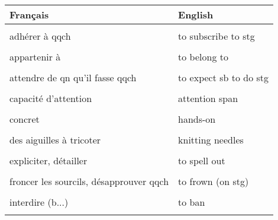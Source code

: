 \documentclass[
  10pt,
]{article}
\begin{document}
\begin{longtable}{ll}
\toprule
Français & English\\
\midrule
\cellcolor{gray!6}{15 sur 20} & \cellcolor{gray!6}{15 out of 20}\\

adhérer à qqch & to subscribe to stg\\

\cellcolor{gray!6}{alors que} & \cellcolor{gray!6}{whereas}\\

appartenir à & to belong to\\

\cellcolor{gray!6}{approvisionner, fournir} & \cellcolor{gray!6}{to supply}\\

attendre de qn qu'il fasse qqch & to expect sb to do stg\\

\cellcolor{gray!6}{bien que} & \cellcolor{gray!6}{although}\\

capacité d'attention & attention span\\

\cellcolor{gray!6}{cautionner} & \cellcolor{gray!6}{to endorse}\\

concret & hands-on\\

\cellcolor{gray!6}{de la boue} & \cellcolor{gray!6}{mud}\\

des aiguilles à tricoter & knitting needles\\

\cellcolor{gray!6}{écouter qqch} & \cellcolor{gray!6}{to listen to stg}\\

expliciter, détailler & to spell out\\

\cellcolor{gray!6}{fonder} & \cellcolor{gray!6}{to found}\\

froncer les sourcils, désapprouver qqch & to frown (on stg)\\

\cellcolor{gray!6}{grandir} & \cellcolor{gray!6}{to grow up}\\

interdire (b...) & to ban\\

\cellcolor{gray!6}{interdire (f...)} & \cellcolor{gray!6}{to forbid}\\


\end{longtable}
\end{document}
